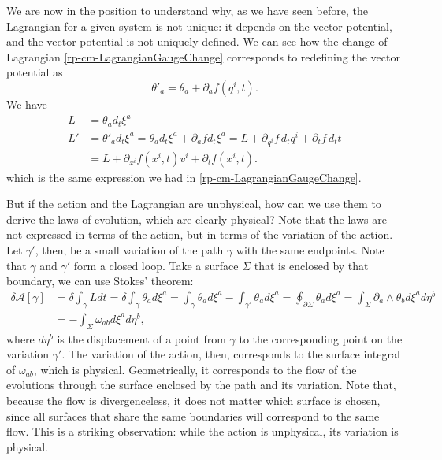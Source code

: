 We are now in the position to understand why, as we have seen before, the Lagrangian for a given system is not unique: it depends on the vector potential, and the vector potential is not uniquely defined. We can see how the change of Lagrangian \ref{rp-cm-LagrangianGaugeChange} corresponds to redefining the vector potential as
\begin{equation}
	\theta'_{a} = \theta_a + \partial_a f(q^i,t).
\end{equation}
We have
\begin{equation}
	\begin{aligned}
		L &= \theta_a d_t \xi^a \\
		L' &= \theta'_a d_t \xi^a = \theta_a d_t \xi^a + \partial_a f d_t \xi^a = L + \partial_{q^i} f \, d_t {q^i} + \partial_t f \, d_t t \\
		&= L + \partial_{x^i} f(x^i, t) v^i + \partial_t f(x^i, t).
	\end{aligned}
\end{equation}
which is the same expression we had in \ref{rp-cm-LagrangianGaugeChange}.

But if the action and the Lagrangian are unphysical, how can we use them to derive the laws of evolution, which are clearly physical? Note that the laws are not expressed in terms of the action, but in terms of the variation of the action. Let $\gamma'$, then, be a small variation of the path $\gamma$ with the same endpoints. Note that $\gamma$ and $\gamma'$ form a closed loop. Take a surface $\Sigma$ that is enclosed by that boundary, we can use Stokes' theorem:
\begin{equation}
	\begin{aligned}
		\delta \mathcal{A}[\gamma] &= \delta \int_\gamma L dt = \delta \int_\gamma \theta_a d\xi^a = \int_\gamma \theta_a d\xi^a - \int_{\gamma'} \theta_a d\xi^a = \oint_{\partial\Sigma} \theta_a d\xi^a = \int_{\Sigma} \partial_a \wedge \theta_b  d\xi^a d\eta^b \\
		&= - \int_{\Sigma} \omega_{ab} d\xi^a d\eta^b, 
	\end{aligned}
\end{equation}
where $d\eta^b$ is the displacement of a point from $\gamma$ to the corresponding point on the variation $\gamma'$. The variation of the action, then, corresponds to the surface integral of $\omega_{ab}$, which is physical. Geometrically, it corresponds to the flow of the evolutions through the surface enclosed by the path and its variation. Note that, because the flow is divergenceless, it does not matter which surface is chosen, since all surfaces that share the same boundaries will correspond to the same flow. This is a striking observation: while the action is unphysical, its variation is physical.

